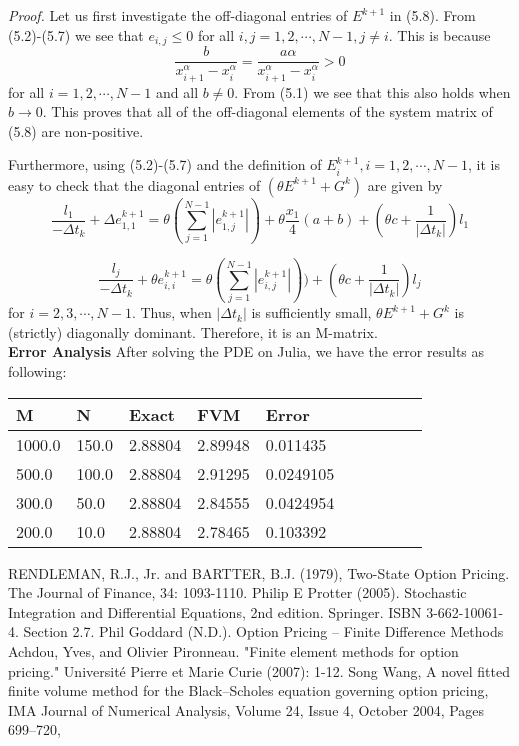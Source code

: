 \documentclass{article}
\begin{document}
\textit{Proof.} Let us first investigate the off-diagonal entries of $E^{k+1} $ in (5.8). From (5.2)-(5.7) we see that $e_{i,j} \leq 0$ for all $i,j = 1,2,\cdots, N-1, j \neq i$. This is because
$$
\frac{b}{x_{i+1}^{\alpha}-x_i^{\alpha}} = \frac{a\alpha}{x_{i+1}^{\alpha}-x_i^{\alpha}} > 0
$$
for all $i = 1, 2, \cdots, N-1$ and all $b \neq 0$. From (5.1) we see that this also holds when $b \rightarrow 0$. This proves that all of the off-diagonal elements of the system matrix of (5.8) are non-positive.

Furthermore, using (5.2)-(5.7) and the definition of $E_i^{k+1}, i = 1, 2, \cdots, N-1$, it is easy to check that the diagonal entries of $(\theta E^{k+1} + G^k)$ are given by
$$
\frac{l_1}{-\Delta t_k} + \Delta e_{1,1}^{k+1} = \theta(\sum_{j=1}^{N-1}|e_{1,j}^{k+1}|) + \theta \frac{x_1}{4}(a + b) + (\theta c + \frac{1}{|\Delta t_k|})l_1
$$

$$
\frac{l_j}{-\Delta t_k} + \theta e_{i,i}^{k+1} = \theta(\sum_{j=1}^{N-1}|e_{i,j}^{k+1}|)) + (\theta c + \frac{1}{|\Delta t_k|})l_j
$$
for $i = 2,3,\cdots, N-1$. Thus, when $|\Delta t_k|$ is sufficiently small, $\theta E^{k+1} + G^k$ is (strictly) diagonally dominant. Therefore, it is an M-matrix.\\
\textbf{Error Analysis}
After solving the PDE on Julia, we have the error results as following:
\begin{table}[!ht]
    \centering
    \begin{tabular}{|l|l|l|l|l|l|l|l|l|l|}
    \hline
        M & N & Exact  & FVM & Error \\ \hline
	1000.0 & 150.0 & 2.88804 & 2.89948  & 0.011435  \\ \hline
	500.0 & 100.0 & 2.88804 &2.91295 & 0.0249105 \\ \hline
        300.0 & 50.0 & 2.88804 & 2.84555 & 0.0424954 \\ \hline
        200.0  & 10.0 & 2.88804 & 2.78465 & 0.103392  \\ \hline
        
    \end{tabular}
\end{table}
\begin{thebibliography}{99}
RENDLEMAN, R.J., Jr. and BARTTER, B.J. (1979), Two-State Option Pricing. The Journal of Finance, 34: 1093-1110.
Philip E Protter (2005). Stochastic Integration and Differential Equations, 2nd edition. Springer. ISBN 3-662-10061-4. Section 2.7.
 Phil Goddard (N.D.). Option Pricing – Finite Difference Methods
Achdou, Yves, and Olivier Pironneau. "Finite element methods for option pricing." Université Pierre et Marie Curie (2007): 1-12.
Song Wang, A novel fitted finite volume method for the Black–Scholes equation governing option pricing, IMA Journal of Numerical Analysis, Volume 24, Issue 4, October 2004, Pages 699–720,
\end{thebibliography}







\end{document}
